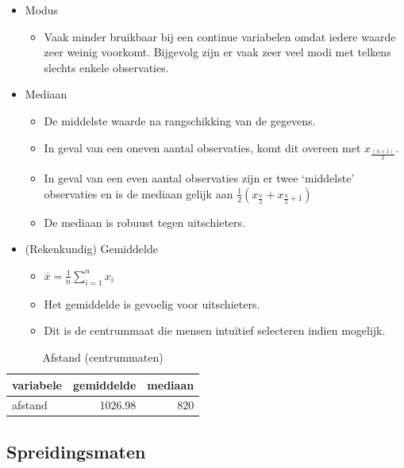\documentclass[]{tufte-book}
\providecommand{\tightlist}{%
  \setlength{\itemsep}{0pt}\setlength{\parskip}{0pt}}
\begin{document}
\begin{itemize}
\tightlist
\item
  Modus

  \begin{itemize}
  \tightlist
  \item
    Vaak minder bruikbaar bij een continue variabelen omdat iedere waarde zeer weinig voorkomt. Bijgevolg zijn er vaak zeer veel modi met telkens slechts enkele observaties.
  \end{itemize}
\item
  Mediaan

  \begin{itemize}
  \tightlist
  \item
    De middelste waarde na rangschikking van de gegevens.
  \item
    In geval van een oneven aantal observaties, komt dit overeen met \(x_{\frac{(n+1)}{2}}\).
  \item
    In geval van een even aantal observaties zijn er twee `middelste' observaties en is de mediaan gelijk aan \(\frac{1}{2}( x_{\frac{n}{2}}+x_{\frac{n}{2}+1})\)
  \item
    De mediaan is robuust tegen uitschieters.
  \end{itemize}
\item
  (Rekenkundig) Gemiddelde

  \begin{itemize}
  \tightlist
  \item
    \(\bar{x} = \frac{1}{n}\sum_{i=1}^n x_i\)
  \item
    Het gemiddelde is gevoelig voor uitschieters.
  \item
    Dit is de centrummaat die mensen intuïtief selecteren indien mogelijk.
  \end{itemize}
\end{itemize}

\begin{table}

\caption{\label{tab:4-9}Afstand (centrummaten)}
\centering
\fontsize{10}{12}\selectfont
\begin{tabular}[t]{lrr}
\toprule
variabele & gemiddelde & mediaan\\
\midrule
afstand & 1026.98 & 820\\
\bottomrule
\end{tabular}
\end{table}

\hypertarget{spreidingsmaten}{%
\subsection*{Spreidingsmaten}\label{spreidingsmaten}}
\end{document}
